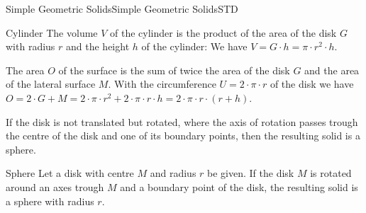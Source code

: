 \begin{MXContent}{Simple Geometric Solids}{Simple Geometric Solids}{STD}
\begin{MXInfo}{Cylinder}
The volume $V$ of the cylinder is the product of the area of the disk 
$G$ with radius $r$ and the height $h$ of the cylinder: We have 
$V = G \cdot h = \pi \cdot r^2 \cdot h$.

The area $O$ of the surface is the sum of twice the area of the disk $G$ and 
the area of the lateral surface $M$. With the circumference $U = 2 \cdot \pi \cdot r$
of the disk we have $O = 2 \cdot G + M = 2 \cdot \pi \cdot r^2 + 2 \cdot \pi \cdot r \cdot h %
 = 2 \cdot \pi \cdot r \cdot (r + h)$.
\end{MXInfo}


If the disk is not translated but rotated, where the axis of rotation passes 
trough the centre of the disk and one of its boundary points, then the resulting 
solid is a sphere.


\begin{MXInfo}{Sphere}
Let a disk with centre $M$ and radius $r$ be given. If the disk $M$ is 
rotated around an axes trough $M$ and a boundary point of the disk, the resulting 
solid is a sphere with radius $r$.

\begin{center}
\end{center}


\end{MXInfo}
\end{MXContent}
